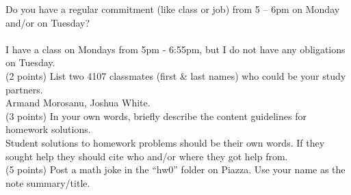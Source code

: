 \documentclass[11pt]{article}
\begin{document}
\noindent Do you have a regular commitment (like class or job)
from 5 -- 6pm on Monday and/or on Tuesday?   \\\\
I have a class on Mondays from 5pm - 6:55pm, but I do not have any obligations on Tuesday.\\

\noindent (2 points) List two 4107 classmates (first \& last names) who could be your study partners. \\
Armand Morosanu, Joshua White.\\

\noindent (3 points) In your own words, briefly describe the content guidelines
for homework solutions. \\
Student solutions to homework problems should be their own words. If they sought help they should cite who and/or where they got help from.\\

\noindent (5 points) Post a math joke in the ``hw0'' folder on Piazza.
Use your name as the note summary/title.
\end{document}

